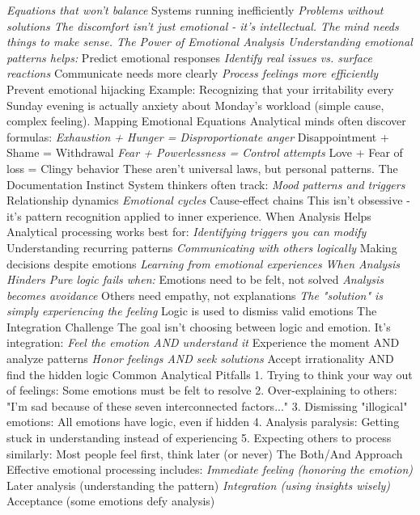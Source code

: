 \documentclass[12pt]{book}
\begin{document}
\textit{ Equations that won't balance
} Systems running inefficiently
\textit{ Problems without solutions
The discomfort isn't just emotional - it's intellectual. The mind needs things to make sense.
The Power of Emotional Analysis
Understanding emotional patterns helps:
} Predict emotional responses
\textit{ Identify real issues vs. surface reactions
} Communicate needs more clearly
\textit{ Process feelings more efficiently
} Prevent emotional hijacking
Example: Recognizing that your irritability every Sunday evening is actually anxiety about Monday's workload (simple cause, complex feeling).
Mapping Emotional Equations
Analytical minds often discover formulas:
\textit{ Exhaustion + Hunger = Disproportionate anger
} Disappointment + Shame = Withdrawal
\textit{ Fear + Powerlessness = Control attempts
} Love + Fear of loss = Clingy behavior
These aren't universal laws, but personal patterns.
The Documentation Instinct
System thinkers often track:
\textit{ Mood patterns and triggers
} Relationship dynamics
\textit{ Emotional cycles
} Cause-effect chains
This isn't obsessive - it's pattern recognition applied to inner experience.
When Analysis Helps
Analytical processing works best for:
\textit{ Identifying triggers you can modify
} Understanding recurring patterns
\textit{ Communicating with others logically
} Making decisions despite emotions
\textit{ Learning from emotional experiences
When Analysis Hinders
Pure logic fails when:
} Emotions need to be felt, not solved
\textit{ Analysis becomes avoidance
} Others need empathy, not explanations
\textit{ The "solution" is simply experiencing the feeling
} Logic is used to dismiss valid emotions
The Integration Challenge
The goal isn't choosing between logic and emotion. It's integration:
\textit{ Feel the emotion AND understand it
} Experience the moment AND analyze patterns
\textit{ Honor feelings AND seek solutions
} Accept irrationality AND find the hidden logic
Common Analytical Pitfalls
1. Trying to think your way out of feelings: Some emotions must be felt to resolve
2. Over-explaining to others: "I'm sad because of these seven interconnected factors..."
3. Dismissing "illogical" emotions: All emotions have logic, even if hidden
4. Analysis paralysis: Getting stuck in understanding instead of experiencing
5. Expecting others to process similarly: Most people feel first, think later (or never)
The Both/And Approach
Effective emotional processing includes:
\textit{ Immediate feeling (honoring the emotion)
} Later analysis (understanding the pattern)
\textit{ Integration (using insights wisely)
} Acceptance (some emotions defy analysis)
\end{document}
